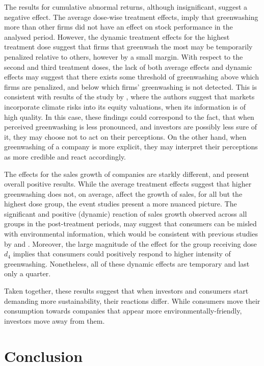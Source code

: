 \documentclass[12pt]{article}
\begin{document}
The results for cumulative abnormal returns, although insignificant, suggest a negative effect. The average dose-wise treatment effects, imply that greenwashing more than other firms did not have an effect on stock performance in the analysed period. However, the dynamic treatment effects for the highest treatment dose suggest that firms that greenwash the most may be temporarily penalized relative to others, however by a small margin. With respect to the second and third treatment doses, the lack of both average effects and dynamic effects may suggest that there exists some threshold of greenwashing above which firms are penalized, and below which firms' greenwashing is not detected. This is consistent with results of the study by \textcite{ilhanClimateRiskDisclosure2023}, where the authors suggest that markets incorporate climate risks into its equity valuations, when its information is of high quality. In this case, these findings could correspond to the fact, that when perceived greenwashing is less pronounced, and investors are possibly less sure of it, they may choose not to act on their perceptions. On the other hand, when greenwashing of a company is more explicit, they may interpret their perceptions as more credible and react accordingly.


The effects for the sales growth of companies are starkly different, and present overall positive results. While the average treatment effects suggest that higher greenwashing does not, on average, affect the growth of sales, for all but the highest dose group, the event studies present a more nuanced picture. The significant and positive (dynamic) reaction of sales growth observed across all groups in the post-treatment periods, may suggest that consumers can be misled with environmental information, which would be consistent with previous studies by \citeauthor{schmuckMisleadingConsumersGreen2018} and \citeauthor{parguelCanEvokingNature2015}. Moreover, the large magnitude of the effect for the group receiving dose $d_4$ implies that consumers could positively respond to higher intensity of greenwashing. Nonetheless, all of these dynamic effects are temporary and last only a quarter.

Taken together, these results suggest that when investors and consumers start demanding more sustainability, their reactions differ. While consumers move their consumption towards companies that appear more environmentally-friendly, investors move away from them.

\newpage
\section{Conclusion}\label{sect:discussion}
\end{document}
